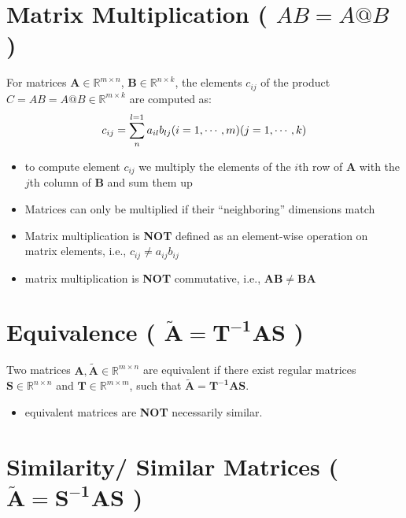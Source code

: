 \section{Matrix Multiplication ( $AB = A@B$ ) \cite{mfml-1}}
For matrices $\mathbf{A} \in \mathbb{R}^{m\times n}$, $\mathbf{B} \in \mathbb{R}^{n\times k}$, the elements $c_{ij}$ of the product $C = AB = A@B \in \mathbb{R}^{m\times k}$ are computed as:
\[
    \displaystyle
    c_{ij} = \sum_{n}^{l=1} a_{il}b_{lj}
    \hfill
    (i=1,\cdots,m)(j=1,\cdots,k)
\]

\begin{itemize}
    \item to compute element $c_{ij}$ we multiply the elements of the $i$th row of $\mathbf{A}$ with the $j$th column of $\mathbf{B}$ and sum them up

    \item Matrices can only be multiplied if their “neighboring” dimensions match

    \item Matrix multiplication is \textbf{NOT} defined as an element-wise operation on matrix elements, i.e., $c_{ij} \neq a_{ij}b_{ij}$

    \item matrix multiplication is \textbf{NOT} commutative, i.e., $\mathbf{AB \neq BA}$
\end{itemize}


\section{Equivalence ( $\mathbf{\tilde{A} = T^{-1}AS}$ ) \cite{mfml-1}}\label{Equivalence}

Two matrices $\mathbf{A, \tilde{A}} \in \mathbb{R}^{m\times n}$ are equivalent if there exist regular matrices $\mathbf{S} \in \mathbb{R}^{n\times n}$ and $\mathbf{T} \in \mathbb{R}^{m\times m}$, such that $\mathbf{\tilde{A} = T^{-1}AS}$.

\begin{itemize}
    \item equivalent matrices are \textbf{NOT} necessarily similar.
\end{itemize}


\section{Similarity/ Similar Matrices ( $\mathbf{\tilde{A} = S^{-1}AS}$ ) \cite{mfml-1}}\label{Similarity/ Similar Matrices}

